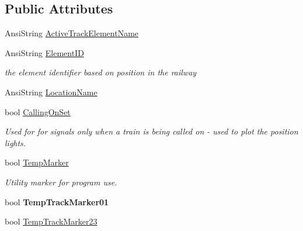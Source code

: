 \subsection*{Public Attributes}
\begin{DoxyCompactItemize}
\item 
Ansi\+String \mbox{\hyperlink{class_t_track_element_aa74717ece7b257122688b6f5855d6125}{Active\+Track\+Element\+Name}}
\item 
\mbox{\label{class_t_track_element_ae780fef4d1277dfeeec0b770ae8b0919}} 
Ansi\+String \mbox{\hyperlink{class_t_track_element_ae780fef4d1277dfeeec0b770ae8b0919}{Element\+ID}}
\begin{DoxyCompactList}\small\item\em the element identifier based on position in the railway \end{DoxyCompactList}\item 
Ansi\+String \mbox{\hyperlink{class_t_track_element_ae4aec8db868ce67f4ec275ce5a2249dc}{Location\+Name}}
\item 
\mbox{\label{class_t_track_element_a7cde223e36c063fedde528797b3df77d}} 
bool \mbox{\hyperlink{class_t_track_element_a7cde223e36c063fedde528797b3df77d}{Calling\+On\+Set}}
\begin{DoxyCompactList}\small\item\em Used for for signals only when a train is being called on -\/ used to plot the position lights. \end{DoxyCompactList}\item 
\mbox{\label{class_t_track_element_a130d91923ac416757bb7e3f47806295a}} 
bool \mbox{\hyperlink{class_t_track_element_a130d91923ac416757bb7e3f47806295a}{Temp\+Marker}}
\begin{DoxyCompactList}\small\item\em Utility marker for program use. \end{DoxyCompactList}\item 
\mbox{\label{class_t_track_element_a1712299f9cb22bb7afbe54e5a781f8ec}} 
bool {\bfseries Temp\+Track\+Marker01}
\item 
\mbox{\label{class_t_track_element_ab0d0c071e2a124e9143e5c7bc2009805}} 
bool \mbox{\hyperlink{class_t_track_element_ab0d0c071e2a124e9143e5c7bc2009805}{Temp\+Track\+Marker23}}

\end{DoxyCompactItemize}
